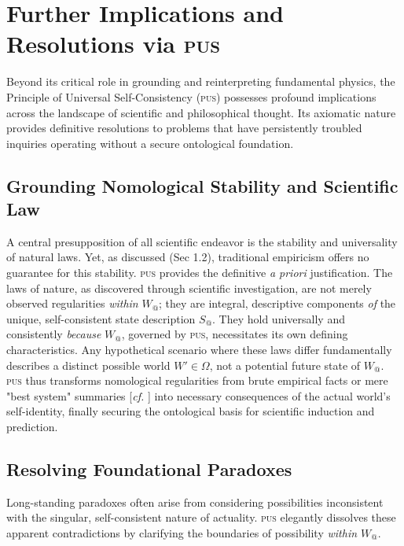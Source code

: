\documentclass[11pt, a4paper]{article}
\makeatletter
\newcommand{\pus}{\textsc{pus}} %
\newcommand{\Wactual}{W_{@}} %
\newcommand{\Sactual}{S_{@}} %
\newcommand{\Omegaset}{\Omega} %
\makeatother
\begin{document}
\section{Further Implications and Resolutions via \pus}
Beyond its critical role in grounding and reinterpreting fundamental physics, the Principle of Universal Self-Consistency (\pus) possesses profound implications across the landscape of scientific and philosophical thought. Its axiomatic nature provides definitive resolutions to problems that have persistently troubled inquiries operating without a secure ontological foundation.

\subsection{Grounding Nomological Stability and Scientific Law}
A central presupposition of all scientific endeavor is the stability and universality of natural laws. Yet, as discussed (Sec 1.2), traditional empiricism offers no guarantee for this stability. \pus{} provides the definitive \textit{a priori} justification. The laws of nature, as discovered through scientific investigation, are not merely observed regularities \textit{within} $\Wactual$; they are integral, descriptive components \textit{of} the unique, self-consistent state description $\Sactual$. They hold universally and consistently \textit{because} $\Wactual$, governed by \pus, necessitates its own defining characteristics. Any hypothetical scenario where these laws differ fundamentally describes a distinct possible world $W' \in \Omegaset$, not a potential future state of $\Wactual$. \pus{} thus transforms nomological regularities from brute empirical facts or mere "best system" summaries [\textit{cf.} \citealp{lewis1973}] into necessary consequences of the actual world's self-identity, finally securing the ontological basis for scientific induction and prediction.

\subsection{Resolving Foundational Paradoxes}
Long-standing paradoxes often arise from considering possibilities inconsistent with the singular, self-consistent nature of actuality. \pus{} elegantly dissolves these apparent contradictions by clarifying the boundaries of possibility \textit{within $\Wactual$}.
\end{document}
